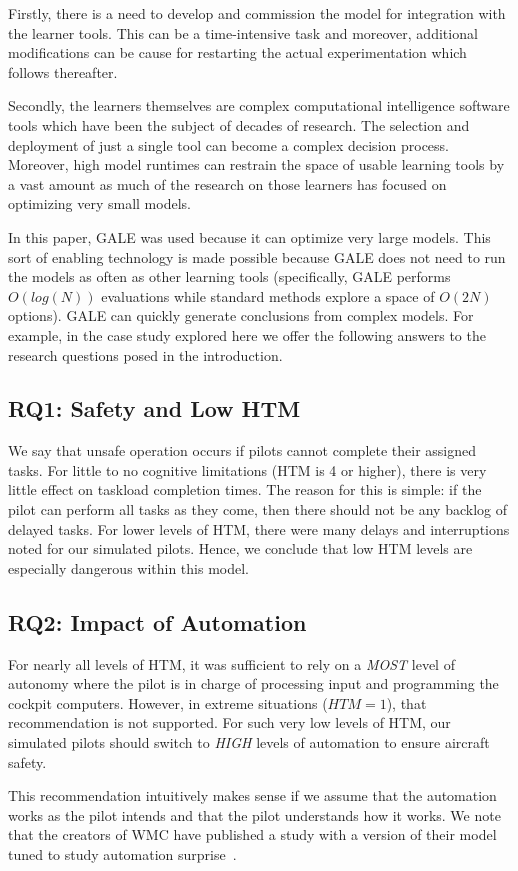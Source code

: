 \documentclass[journal]{IEEEtran}
\newenvironment{changed}{\par}{\par}
\begin{document}
Firstly, there is a need to develop and commission the model for integration
with the learner tools.  
This can be a time-intensive task and moreover, additional modifications can be cause for restarting the actual experimentation which follows thereafter.  

Secondly, the learners themselves are complex computational intelligence software tools which have been the subject of decades of research.  
The selection and deployment of just a single tool can become a complex decision
process.  
Moreover, high model runtimes can restrain the space of usable learning tools by a vast amount as much of the research on those learners has focused on optimizing very small models.  

In this paper, GALE was used because it can optimize very large models.  
This sort of enabling technology is made possible because GALE does not need to run the models as often as other learning tools (specifically, GALE performs $O(log(N))$ evaluations while standard methods explore a space of $O(2N)$ options).
GALE can quickly generate conclusions from complex models. 
For example, in the case study explored here we offer the following answers to the research questions posed in the introduction.




\subsection{RQ1: Safety and Low HTM}
We say that unsafe operation occurs if pilots cannot complete their assigned tasks.
For little to no cognitive limitations (HTM is 4 or higher), there is very little effect on taskload completion times.  
The reason for this is simple: if the pilot can perform all tasks as they come, then there should not be any backlog of delayed tasks.  
For lower levels of HTM, there were many delays and interruptions noted for our simulated pilots. 
Hence, we conclude that low HTM levels are especially dangerous within this model.

\subsection{RQ2: Impact of Automation}

For nearly all levels of HTM, it was sufficient to rely on a {\em MOST} level of autonomy where the pilot is in charge of processing input and programming the cockpit computers.
However, in extreme situations ($\mathit{HTM}=1$), that recommendation is not supported.  
For such very low levels of HTM, our simulated pilots should switch to {\em HIGH} levels of automation to ensure aircraft safety.
\begin{changed}
This recommendation intuitively makes sense if we assume that the automation works as the pilot intends
and that the pilot understands how it works.
 We note that the creators of WMC have  published a study with a version of their model tuned to study automation surprise~\cite{Gelman2014}.
\end{changed}
\end{document}
